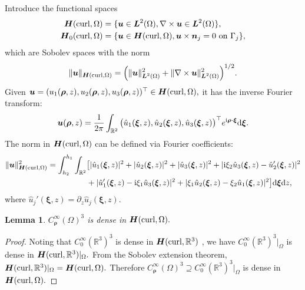 \documentclass[11pt,reqno]{amsart}
\newtheorem{lemm}[theo]{Lemma}
\numberwithin{equation}{section}
\begin{document}
Introduce the functional spaces
\begin{align*}
\boldsymbol H({\rm curl}, \Omega)&=\{ \boldsymbol u \in \boldsymbol L^2(\Omega),
\nabla \times \boldsymbol u \in \boldsymbol L^2 (\Omega) \},\\
\boldsymbol H_0({\rm curl}, \Omega)&=\{ \boldsymbol u \in \boldsymbol
H({\rm curl}, \Omega), \boldsymbol{u}\times\boldsymbol n_j=0~\text{on} ~
\Gamma_j\},
\end{align*}
which are Sobolev spaces with the norm
\[
\|\boldsymbol u\|_{\boldsymbol H( {\rm curl}, \Omega)}=\Big( \| \boldsymbol
u\|^2_{\boldsymbol L^2 (\Omega)}+\|\nabla \times \boldsymbol u\|^2_{\boldsymbol
L^2 (\Omega)}\Big)^{1/2}.
\]
Given $\boldsymbol u = (u_1(\boldsymbol \rho, z), u_2 (\boldsymbol \rho, z), u_3
(\boldsymbol \rho, z))^\top\in\boldsymbol H ({\rm curl}, \Omega),$ it has
the inverse Fourier transform:
\[
\boldsymbol u(\boldsymbol \rho, z)= \frac{1}{2\pi}\int_{\mathbb R^2} \big(\hat
u_1(\boldsymbol \xi, z), \hat u_2 (\boldsymbol \xi, z), \hat u_3 (\boldsymbol
\xi, z)\big)^{\top} e^{{\rm i} \boldsymbol \rho \cdot \boldsymbol \xi} {\rm d}
\boldsymbol \xi.
\]
The norm in $\boldsymbol H ({\rm curl}, \Omega)$ can be defined via Fourier
coefficients:
\begin{align*}
\| \boldsymbol u\|^2_{\boldsymbol H ({\rm curl}, \Omega)}
=\int_{h_2}^{h_1} \int_{\mathbb R^2}
&\big[|\hat u_1 (\boldsymbol \xi, z)|^2 +|\hat u_2 (\boldsymbol \xi, z)|^2+|\hat
u_3 (\boldsymbol \xi, z)|^2+|{\rm i} \xi_{2} \hat u_3 (\boldsymbol \xi, z) -\hat
u_2'(\boldsymbol \xi, z)|^2\\
&+|\hat u_1'(\boldsymbol \xi, z)-{\rm i}\xi_1 \hat u_3 (\boldsymbol \xi,
z)|^2+|\xi_1 \hat u_2 (\boldsymbol \xi, z)- \xi_2 \hat u_1 (\boldsymbol \xi,
z)|^2 \big]{\rm d}\boldsymbol \xi {\rm d} z,
\end{align*}
where $\hat u_j'(\boldsymbol \xi, z)=\partial_z \hat u_j (\boldsymbol \xi, z).$

\begin{lemm}
$C_{\boldsymbol \rho}^{\infty} (\Omega)^3 $ is dense in $\boldsymbol H ({\rm
curl}, \Omega).$ 
\end{lemm}

\begin{proof}
Noting that $C_0^{\infty} (\mathbb R^3)^3$ is dense in $\boldsymbol H ({\rm
curl}, \mathbb R^3)$ , we have $C_0^{\infty} (\mathbb R^3)^3|_{\Omega}$ is dense
in $\boldsymbol H ({\rm curl}, \mathbb R^3)|_{\Omega}.$ From the Sobolev
extension theorem, $\boldsymbol H ({\rm curl}, \mathbb
R^3)|_{\Omega}=\boldsymbol H ({\rm curl}, \Omega).$ Therefore $C_{\boldsymbol
\rho}^{\infty} (\Omega)^3\supseteq C_0^{\infty} (\mathbb R^3)^3|_{\Omega}$ is
dense in  $\boldsymbol H ({\rm curl}, \Omega).$ 
\end{proof}
\end{document}
